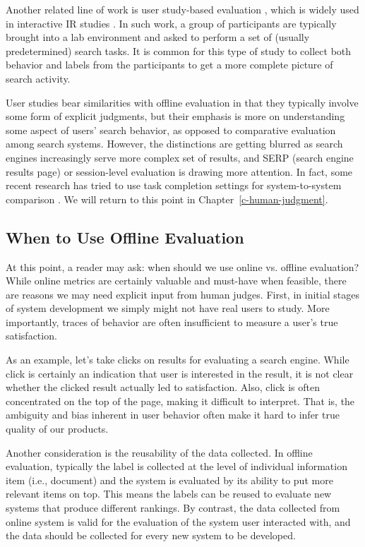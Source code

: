 \documentclass[openany]{now} %
\begin{document}
Another related line of work is user study-based evaluation \citep{Bron:2013, Liu:2014, Shah:2011}, which is widely used in interactive IR studies \citep{kelly2009methods}. In such work, a group of participants are typically brought into a lab environment and asked to perform a set of (usually predetermined) search tasks. It is common for this type of study to collect both behavior and labels from the participants to get a more complete picture of search activity. 

User studies bear similarities with offline evaluation in that they typically involve some form of explicit judgments, but their emphasis is more on understanding some aspect of users' search behavior, as opposed to comparative evaluation among search systems. However, the distinctions are getting blurred as search engines increasingly serve more complex set of results, and SERP (search engine results page) or session-level evaluation is drawing more attention. In fact, some recent research has tried to use task completion settings for system-to-system comparison \citep{Xu:2009}. We will return to this point in Chapter~\ref{c-human-judgment}.

\subsection{When to Use Offline Evaluation}

At this point, a reader may ask: when should we use online vs. offline evaluation? While online metrics are certainly valuable and must-have when feasible, there are reasons we may need explicit input from human judges. First, in initial stages of system development we simply might not have real users to study. More importantly, traces of behavior are often insufficient to measure a user's true satisfaction. 

As an example, let's take clicks on results for evaluating a search engine. While click is certainly an indication that user is interested in the result, it is not clear whether the clicked result actually led to satisfaction. Also, click is often concentrated on the top of the page, making it difficult to interpret. That is, the ambiguity and bias inherent in user behavior often make it hard to infer true quality of our products.

Another consideration is the reusability of the data collected. In offline evaluation, typically the label is collected at the level of individual information item (i.e., document) and the system is evaluated by its ability to put more relevant items on top. This means the labels can be reused to evaluate new systems that produce different rankings. By contrast, the data collected from online system is valid for the evaluation of the system user interacted with, and the data should be collected for every new system to be developed.
\end{document}
